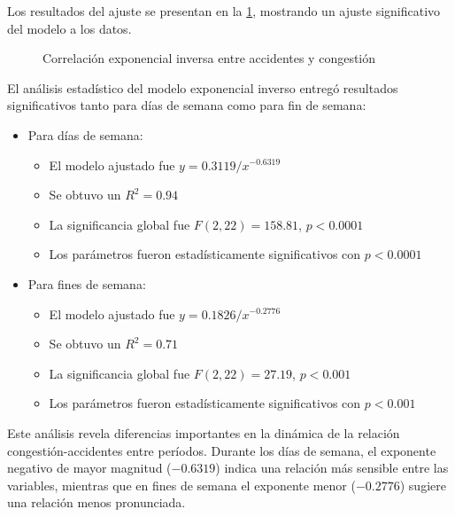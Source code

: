 \documentclass[12pt]{article}
\begin{document}
Los resultados del ajuste se presentan en la \cref{fig:corr_exp}, mostrando un ajuste significativo del modelo a los datos.

\begin{figure}[H]
    \centering
    \newline
    \newline
    \caption{Correlación exponencial inversa entre accidentes y congestión}
    \label{fig:corr_exp}
\end{figure}

El análisis estadístico del modelo exponencial inverso entregó resultados significativos tanto para días de semana como para fin de semana:

\begin{itemize}
    \item Para días de semana:
    \begin{itemize}
        \item El modelo ajustado fue $y = 0.3119/x^{-0.6319}$
        \item Se obtuvo un $R^2 = 0.94$
        \item La significancia global fue $F(2, 22) = 158.81$, $p < 0.0001$
        \item Los parámetros fueron estadísticamente significativos con $p < 0.0001$
    \end{itemize}

    \item Para fines de semana:
    \begin{itemize}
        \item El modelo ajustado fue $y = 0.1826/x^{-0.2776}$
        \item Se obtuvo un $R^2 = 0.71$
        \item La significancia global fue $F(2, 22) = 27.19$, $p < 0.001$
        \item Los parámetros fueron estadísticamente significativos con $p < 0.001$
    \end{itemize}
\end{itemize}

Este análisis revela diferencias importantes en la dinámica de la relación congestión-accidentes entre períodos. Durante los días de semana, el exponente negativo de mayor magnitud ($-0.6319$) indica una relación más sensible entre las variables, mientras que en fines de semana el exponente menor ($-0.2776$) sugiere una relación menos pronunciada.
\end{document}
